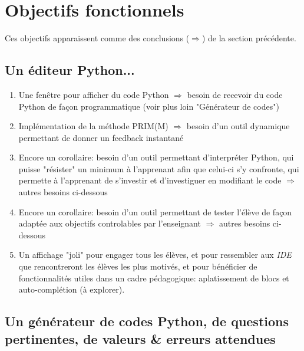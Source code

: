 \documentclass[11pt,a4paper]{article}
\begin{document}
\newpage
\section{Objectifs fonctionnels}

Ces objectifs apparaissent comme des conclusions ($\Rightarrow$) de la section précédente.

\subsection{Un éditeur Python...}
\begin{enumerate}
    
    \item Une fenêtre pour afficher du code Python $\Rightarrow$ besoin de recevoir du code Python de façon programmatique (voir plus loin "Générateur de codes")
    
    \item Implémentation de la méthode PRIM(M) $\Rightarrow$ besoin d'un outil dynamique permettant de donner un feedback instantané
    
    \item Encore un corollaire: besoin d'un outil permettant d'interpréter Python, qui puisse "résister" un minimum à l'apprenant afin que celui-ci s'y confronte, qui permette à l'apprenant de s'investir et d'investiguer en modifiant le code $\Rightarrow$ autres besoins ci-dessous
    
    \item Encore un corollaire: besoin d'un outil permettant de tester l'élève de façon adaptée aux objectifs controlables par l'enseignant $\Rightarrow$ autres besoins ci-dessous

    \item Un affichage "joli" pour engager tous les élèves, et pour ressembler aux \textit{IDE} que rencontreront les élèves les plus motivés, et pour bénéficier de fonctionnalités utiles dans un cadre pédagogique: aplatissement de blocs et auto-complétion (à explorer).
    
\end{enumerate}

\subsection{Un générateur de codes Python, de questions pertinentes, de valeurs \& erreurs attendues}
\end{document}
